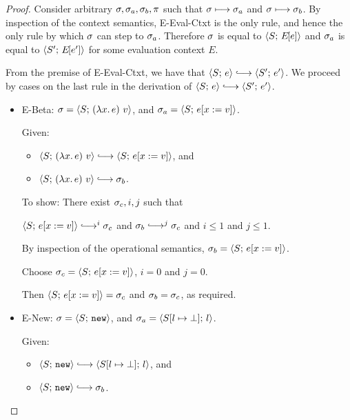 \begin{proof}
  Consider arbitrary $\sigma, \sigma_a, \sigma_b, \pi$ such that $\sigma
  \longmapsto \sigma_a$ and $\sigma \longmapsto \sigma_b$.  By inspection
  of the context semantics, {\sc E-Eval-Ctxt} is the only rule, and
  hence the only rule by which $\sigma$ can step to $\sigma_a$.
  Therefore $\sigma$ is equal to $\langle S;\, E\hspace{-1mm}\left[e\right] \rangle$ and $\sigma_a$ is
  equal to $\langle S';\, E\hspace{-1mm}\left[e'\right] \rangle$ for some evaluation context $E$.

  From the premise of {\sc E-Eval-Ctxt}, we have that $\config{S}{e}
  \parstepsto \config{S'}{e'}$.  We proceed by cases on the last rule
  in the derivation of $\config{S}{e} \parstepsto \config{S'}{e'}$.


  \begin{itemize}
    \item {\sc E-Beta}: $\sigma = \langle S;\, (\lambda x.\,e)~v \rangle$,
      and $\sigma_a = \langle S;\, e[x := v] \rangle$.

      Given:
      \begin{itemize}
      \item $\config{S}{\app{(\lam{x}{e})}{v}} \parstepsto
        \config{S}{\subst{e}{x}{v}}$, and
      \item $\config{S}{\app{(\lam{x}{e})}{v}} \parstepsto \conf_b$.
      \end{itemize}

      To show: There exist $\sigma_c, i, j$ such that

      $\config{S}{\subst{e}{x}{v}} \parstepsto^i \conf_c$ and $\conf_b
      \parstepsto^j \conf_c$ and $i \leq 1$ and $j \leq 1$.

      By inspection of the operational semantics, $\sigma_b =
      \langle S;\, e[x := v] \rangle$.

      Choose $\sigma_c = \langle S;\, e[x := v] \rangle$, $i = 0$ and $j =
      0$.

      Then $\langle S;\, e[x := v] \rangle = \sigma_c$ and $\sigma_b =
      \sigma_c$, as required.

    \item {\sc E-New}: $\sigma = \langle S;\, \mbox{\texttt{new}} \rangle$, and $\sigma_a =
      \langle S[l \mapsto \bot];\, l \rangle$.

      Given:
      \begin{itemize}
      \item $\config{S}{\NEW} \parstepsto
        \config{\extSRaw{S}{l}{\bot}}{l}$, and
      \item $\config{S}{\NEW} \parstepsto \conf_b$.
      \end{itemize}


\end{itemize}
\end{proof}
